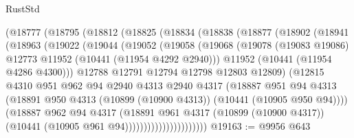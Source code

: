 \begin{lexlean}{RustStd}
\begin{coremodule}
            (@18777
              (@18795
                (@18812
                  (@18825
                    (@18834
                      (@18838
                        (@18877
                          (@18902
                            (@18941
                              (@18963
                                (@19022
                                  (@19044
                                    (@19052
                                      (@19058
                                        (@19068
                                          (@19078
                                            (@19083 @19086)
                                            @12773
                                            @11952
                                            (@10441 (@11954 @4292 @2940)))
                                          @11952
                                          (@10441 (@11954 @4286 @4300)))
                                        @12788
                                        @12791
                                        @12794
                                        @12798
                                        @12803
                                        @12809)
                                      (@12815
                                        @4310
                                        @951
                                        @962
                                        @94
                                        @2940
                                        @4313
                                        @2940
                                        @4317
                                        (@18887
                                          @951
                                          @94
                                          @4313
                                          (@18891
                                            @950
                                            @4313
                                            (@10899 (@10900 @4313))
                                            (@10441 (@10905 @950 @94))))
                                        (@18887
                                          @962
                                          @94
                                          @4317
                                          (@18891
                                            @961
                                            @4317
                                            (@10899 (@10900 @4317))
                                            (@10441 (@10905 @961 @94))))))))))))))))))))))
@19163 := @9956 @643

\end{coremodule}
\end{lexlean}

